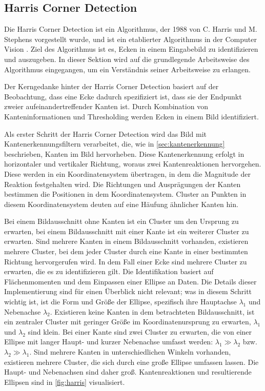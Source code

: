 
\subsection{Harris Corner Detection}
\label{sec:harris_corners}

Die Harris Corner Detection ist ein Algorithmus, der 1988 von C. Harris und M. Stephens vorgestellt wurde, und ist ein etablierter Algorithmus in der Computer Vision \cite{harris_corners,cv_general}. Ziel des Algorithmus ist es, Ecken in einem Eingabebild zu identifizieren und auszugeben. In dieser Sektion wird auf die grundlegende Arbeitsweise des Algorithmus eingegangen, um ein Verständnis seiner Arbeitsweise zu erlangen.

Der Kerngedanke hinter der Harris Corner Detection basiert auf der Beobachtung, dass eine Ecke dadurch spezifiziert ist, dass sie der Endpunkt zweier aufeinandertreffender Kanten ist. Durch Kombination von Kanteninformationen und Thresholding werden Ecken in einem Bild identifiziert.

Als erster Schritt der Harris Corner Detection wird das Bild mit Kantenerkennungsfiltern verarbeitet, die, wie in \autoref{sec:kantenerkennung} beschrieben, Kanten im Bild hervorheben. Diese Kantenerkennung erfolgt in horizontaler und vertikaler Richtung, woraus zwei Kantenreaktionen hervorgehen. Diese werden in ein Koordinatensystem übertragen, in dem die Magnitude der Reaktion festgehalten wird. Die Richtungen und Ausprägungen der Kanten bestimmen die Positionen in dem Koordinatensystem. Cluster an Punkten in diesem Koordinatensystem deuten auf eine Häufung ähnlicher Kanten hin.

Bei einem Bildausschnitt ohne Kanten ist ein Cluster um den Ursprung zu erwarten, bei einem Bildausschnitt mit einer Kante ist ein weiterer Cluster zu erwarten. Sind mehrere Kanten in einem Bildausschnitt vorhanden, existieren mehrere Cluster, bei dem jeder Cluster durch eine Kante in einer bestimmten Richtung hervorgerufen wird. In dem Fall einer Ecke sind mehrere Cluster zu erwarten, die es zu identifizieren gilt. Die Identifikation basiert auf Flächenmomenten und dem Einpassen einer Ellipse an Daten. Die Details dieser Implementierung sind für einen Überblick nicht relevant; was in diesem Schritt wichtig ist, ist die Form und Größe der Ellipse, spezifisch ihre Hauptachse $\lambda_1$ und Nebenachse $\lambda_2$. Existieren keine Kanten in dem betrachteten Bildausschnitt, ist ein zentraler Cluster mit geringer Größe im Koordinatenursprung zu erwarten, $\lambda_1$ und $\lambda_2$ sind klein. Bei einer Kante sind zwei Cluster zu erwarten, die von einer Ellipse mit langer Haupt- und kurzer Nebenachse umfasst werden: $\lambda_1 \gg \lambda_2$ bzw. $\lambda_2 \gg \lambda_1$. Sind mehrere Kanten in unterschiedlichen Winkeln vorhanden, existieren mehrere Cluster, die sich durch eine große Ellipse umfassen lassen. Die Haupt- und Nebenachsen sind daher groß. Kantenreaktionen und resultierende Ellipsen sind in \autoref{fig:harris} visualisiert.

